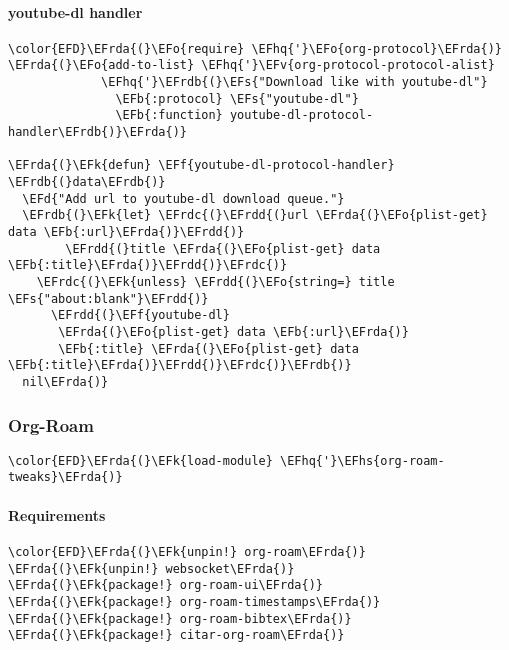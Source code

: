 \documentclass[a4wide,10pt]{article}
\newcommand{\EFs}[1]{\textcolor{EFs}{#1}} %
\newcommand{\EFd}[1]{\textcolor{EFd}{#1}} %
\newcommand{\EFk}[1]{\textcolor{EFk}{#1}} %
\newcommand{\EFb}[1]{\textcolor{EFb}{#1}} %
\newcommand{\EFf}[1]{\textcolor{EFf}{#1}} %
\newcommand{\EFv}[1]{\textcolor{EFv}{#1}} %
\newcommand{\EFo}[1]{\textcolor{EFo}{#1}} %
\newcommand{\EFhq}[1]{\textcolor{EFhq}{#1}} %
\newcommand{\EFhs}[1]{\textcolor{EFhs}{#1}} %
\newcommand{\EFrda}[1]{\textcolor{EFrda}{#1}} %
\newcommand{\EFrdb}[1]{\textcolor{EFrdb}{#1}} %
\newcommand{\EFrdc}[1]{\textcolor{EFrdc}{#1}} %
\newcommand{\EFrdd}[1]{\textcolor{EFrdd}{#1}} %
\begin{document}
\paragraph{youtube-dl handler}
\label{sec:org122537d}
\begin{Code}
\begin{Verbatim}
\color{EFD}\EFrda{(}\EFo{require} \EFhq{'}\EFo{org-protocol}\EFrda{)}
\EFrda{(}\EFo{add-to-list} \EFhq{'}\EFv{org-protocol-protocol-alist}
             \EFhq{'}\EFrdb{(}\EFs{"Download like with youtube-dl"}
               \EFb{:protocol} \EFs{"youtube-dl"}
               \EFb{:function} youtube-dl-protocol-handler\EFrdb{)}\EFrda{)}

\EFrda{(}\EFk{defun} \EFf{youtube-dl-protocol-handler} \EFrdb{(}data\EFrdb{)}
  \EFd{"Add url to youtube-dl download queue."}
  \EFrdb{(}\EFk{let} \EFrdc{(}\EFrdd{(}url \EFrda{(}\EFo{plist-get} data \EFb{:url}\EFrda{)}\EFrdd{)}
        \EFrdd{(}title \EFrda{(}\EFo{plist-get} data \EFb{:title}\EFrda{)}\EFrdd{)}\EFrdc{)}
    \EFrdc{(}\EFk{unless} \EFrdd{(}\EFo{string=} title \EFs{"about:blank"}\EFrdd{)}
      \EFrdd{(}\EFf{youtube-dl}
       \EFrda{(}\EFo{plist-get} data \EFb{:url}\EFrda{)}
       \EFb{:title} \EFrda{(}\EFo{plist-get} data \EFb{:title}\EFrda{)}\EFrdd{)}\EFrdc{)}\EFrdb{)}
  nil\EFrda{)}
\end{Verbatim}
\end{Code}
\subsubsection{Org-Roam}
\label{sec:orgeff81dc}
\begin{Code}
\begin{Verbatim}
\color{EFD}\EFrda{(}\EFk{load-module} \EFhq{'}\EFhs{org-roam-tweaks}\EFrda{)}
\end{Verbatim}
\end{Code}
\paragraph{Requirements}
\label{sec:org772088f}
\begin{Code}
\begin{Verbatim}
\color{EFD}\EFrda{(}\EFk{unpin!} org-roam\EFrda{)}
\EFrda{(}\EFk{unpin!} websocket\EFrda{)}
\EFrda{(}\EFk{package!} org-roam-ui\EFrda{)}
\EFrda{(}\EFk{package!} org-roam-timestamps\EFrda{)}
\EFrda{(}\EFk{package!} org-roam-bibtex\EFrda{)}
\EFrda{(}\EFk{package!} citar-org-roam\EFrda{)}
\end{Verbatim}
\end{Code}
\end{document}
